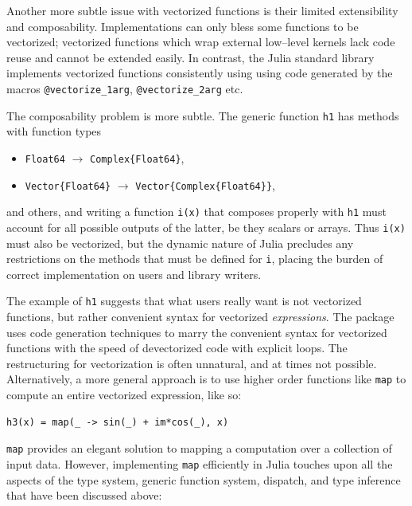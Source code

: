 \documentclass[pldi]{sigplanconf-pldi15}
\begin{document}
Another more subtle issue with vectorized functions is their limited
extensibility and composability. Implementations can only bless some
functions to be vectorized; vectorized functions which wrap external low--level
kernels lack code reuse and cannot be extended easily. In contrast, the Julia
standard library implements vectorized functions consistently using using code
generated by the macros \verb|@vectorize_1arg|, \verb|@vectorize_2arg| etc.

The composability problem is more subtle. The generic function \verb|h1| has
methods with function types

\begin{itemize}
	\item \verb|Float64| $\rightarrow$ \verb|Complex{Float64}|,
	\item \verb|Vector{Float64}| $\rightarrow$ \verb|Vector{Complex{Float64}}|,
\end{itemize}
%
and others, and writing a function \verb|i(x)| that composes properly with
\verb|h1| must account for all possible outputs of the latter, be they scalars
or arrays. Thus \verb|i(x)| must also be vectorized, but the dynamic nature of
Julia precludes any restrictions on the methods that must be defined for
\verb|i|, placing the burden of correct implementation on users and library
writers.

The example of \verb|h1| suggests that what users really want is not vectorized
functions, but rather convenient syntax for vectorized \textit{expressions}.
The  package uses code generation techniques to marry
the convenient syntax for vectorized functions with the speed of devectorized
code with explicit loops. The restructuring for vectorization is often
unnatural, and at times not possible. Alternatively, a more general approach is
to use higher order functions like \verb|map| to compute an entire vectorized
expression, like so:

\begin{lstlisting}
h3(x) = map(_ -> sin(_) + im*cos(_), x)
\end{lstlisting}
%
\verb|map| provides an elegant solution to mapping a computation over a
collection of input data. However, implementing \verb|map| efficiently in Julia
touches upon all the aspects of the type system, generic function system,
dispatch, and type inference that have been discussed above:
\end{document}
